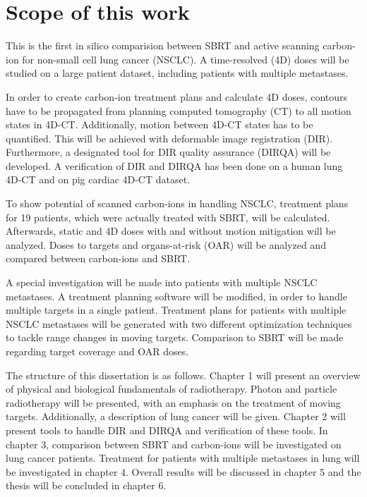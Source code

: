 \documentclass[type=dr, dr=rernat, accentcolor=tud7b,colorbacktitle, bigchapter, openright, twoside, 12pt ]{tudthesis}
\begin{document}
\newpage

\section*{Scope of this work}

This is the first in silico comparision between SBRT and active scanning carbon-ion for non-small cell lung cancer (NSCLC). A time-resolved (4D) doses will be studied on a large patient dataset, including patients with multiple metastases.

In order to create carbon-ion treatment plans and calculate 4D doses, contours have to be propagated from planning computed tomography (CT) to all motion states in 4D-CT. Additionally, motion between 4D-CT states has to be quantified. 
This will be achieved with deformable image registration (DIR). 
Furthermore, a designated tool for DIR quality assurance (DIRQA) will be developed. A verification of DIR and DIRQA has been done on a human lung 4D-CT and on pig cardiac 4D-CT dataset.

To show potential of scanned carbon-ions in handling NSCLC, treatment plans for 19 patients, which were actually treated with SBRT, will be calculated. Afterwards, static and 4D doses with and without motion
mitigation will be analyzed. Doses to targets and organs-at-risk (OAR) will be analyzed and compared between carbon-ions and SBRT.

A special investigation will be made into patients with multiple NSCLC metastases. A treatment planning software will be modified, in order to handle multiple targets in a single patient. 
Treatment plans for patients with multiple NSCLC metastases will be generated with two different optimization techniques to tackle range changes in moving targets. Comparison to SBRT will be made regarding target coverage and OAR doses.

The structure of this dissertation is as follows. Chapter 1 will present an overview of physical and biological fundamentals of radiotherapy. Photon and particle radiotherapy will be presented, with an emphasis on the treatment of moving targets.
Additionally, a description of lung cancer will be given. Chapter 2 will present tools to handle DIR and DIRQA and verification of these tools. In chapter 3, comparison between SBRT and carbon-ions will be investigated on lung cancer patients.
Treatment for patients with multiple metastases in lung will be investigated in chapter 4. Overall results will be discussed in chapter 5 and the thesis will be concluded in chapter 6.



{}
\end{document}
